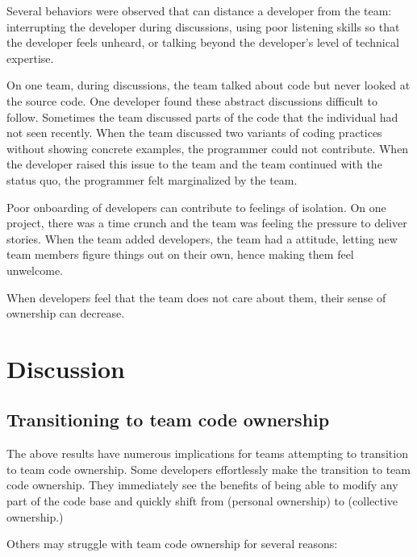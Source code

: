 Several behaviors were observed that can distance a developer from the team: interrupting the developer during discussions, using poor listening skills so that the developer feels unheard, or talking beyond the developer's level of technical expertise. 

On one team, during discussions, the team talked about code but never looked at the source code. One developer found these abstract discussions difficult to follow. Sometimes the team discussed parts of the code that the individual had not seen recently. When the team discussed two variants of coding practices without showing concrete examples, the programmer could not contribute. When the developer raised this issue to the team and the team continued with the status quo, the programmer felt marginalized by the team.

Poor onboarding of developers can contribute to feelings of isolation. On one project, there was a time crunch and the team was feeling the pressure to deliver stories. When the team added developers, the team had a  attitude, letting new team members figure things out on their own, hence making them feel unwelcome.

When developers feel that the team does not care about them, their sense of ownership can decrease.

\section{Discussion}
\label{Discussion}
\subsection{Transitioning to team code ownership}
\label{Transitioning}

The above results have numerous implications for teams attempting to transition to team code ownership. Some developers effortlessly make the transition to team code ownership. They immediately see the benefits of being able to modify any part of the code base and quickly shift from  (personal ownership) to  (collective ownership.)

Others may struggle with team code ownership for several reasons:

